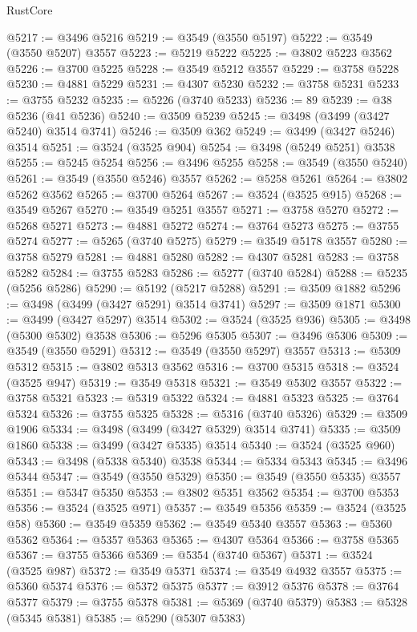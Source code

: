 \begin{lexlean}{RustCore}
\begin{coremodule}
@5217 := @3496 @5216
@5219 := @3549 (@3550 @5197)
@5222 := @3549 (@3550 @5207) @3557
@5223 := @5219 @5222
@5225 := @3802 @5223 @3562
@5226 := @3700 @5225
@5228 := @3549 @5212 @3557
@5229 := @3758 @5228
@5230 := @4881 @5229
@5231 := @4307 @5230
@5232 := @3758 @5231
@5233 := @3755 @5232
@5235 := @5226 (@3740 @5233)
@5236 := 89
@5239 := @38 @5236 (@41 @5236)
@5240 := @3509 @5239
@5245 := @3498 (@3499 (@3427 @5240) @3514 @3741)
@5246 := @3509 @362
@5249 := @3499 (@3427 @5246) @3514
@5251 := @3524 (@3525 @904)
@5254 := @3498 (@5249 @5251) @3538
@5255 := @5245 @5254
@5256 := @3496 @5255
@5258 := @3549 (@3550 @5240)
@5261 := @3549 (@3550 @5246) @3557
@5262 := @5258 @5261
@5264 := @3802 @5262 @3562
@5265 := @3700 @5264
@5267 := @3524 (@3525 @915)
@5268 := @3549 @5267
@5270 := @3549 @5251 @3557
@5271 := @3758 @5270
@5272 := @5268 @5271
@5273 := @4881 @5272
@5274 := @3764 @5273
@5275 := @3755 @5274
@5277 := @5265 (@3740 @5275)
@5279 := @3549 @5178 @3557
@5280 := @3758 @5279
@5281 := @4881 @5280
@5282 := @4307 @5281
@5283 := @3758 @5282
@5284 := @3755 @5283
@5286 := @5277 (@3740 @5284)
@5288 := @5235 (@5256 @5286)
@5290 := @5192 (@5217 @5288)
@5291 := @3509 @1882
@5296 := @3498 (@3499 (@3427 @5291) @3514 @3741)
@5297 := @3509 @1871
@5300 := @3499 (@3427 @5297) @3514
@5302 := @3524 (@3525 @936)
@5305 := @3498 (@5300 @5302) @3538
@5306 := @5296 @5305
@5307 := @3496 @5306
@5309 := @3549 (@3550 @5291)
@5312 := @3549 (@3550 @5297) @3557
@5313 := @5309 @5312
@5315 := @3802 @5313 @3562
@5316 := @3700 @5315
@5318 := @3524 (@3525 @947)
@5319 := @3549 @5318
@5321 := @3549 @5302 @3557
@5322 := @3758 @5321
@5323 := @5319 @5322
@5324 := @4881 @5323
@5325 := @3764 @5324
@5326 := @3755 @5325
@5328 := @5316 (@3740 @5326)
@5329 := @3509 @1906
@5334 := @3498 (@3499 (@3427 @5329) @3514 @3741)
@5335 := @3509 @1860
@5338 := @3499 (@3427 @5335) @3514
@5340 := @3524 (@3525 @960)
@5343 := @3498 (@5338 @5340) @3538
@5344 := @5334 @5343
@5345 := @3496 @5344
@5347 := @3549 (@3550 @5329)
@5350 := @3549 (@3550 @5335) @3557
@5351 := @5347 @5350
@5353 := @3802 @5351 @3562
@5354 := @3700 @5353
@5356 := @3524 (@3525 @971)
@5357 := @3549 @5356
@5359 := @3524 (@3525 @58)
@5360 := @3549 @5359
@5362 := @3549 @5340 @3557
@5363 := @5360 @5362
@5364 := @5357 @5363
@5365 := @4307 @5364
@5366 := @3758 @5365
@5367 := @3755 @5366
@5369 := @5354 (@3740 @5367)
@5371 := @3524 (@3525 @987)
@5372 := @3549 @5371
@5374 := @3549 @4932 @3557
@5375 := @5360 @5374
@5376 := @5372 @5375
@5377 := @3912 @5376
@5378 := @3764 @5377
@5379 := @3755 @5378
@5381 := @5369 (@3740 @5379)
@5383 := @5328 (@5345 @5381)
@5385 := @5290 (@5307 @5383)

\end{coremodule}
\end{lexlean}
